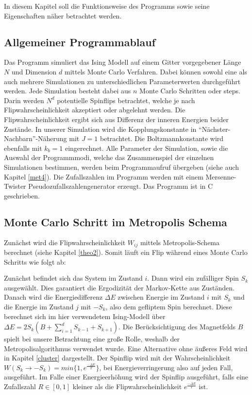 
In diesem Kapitel soll die Funktionsweise des Programms sowie seine Eigenschaften näher betrachtet werden.


\subsection{Allgemeiner Programmablauf}

Das Programm simuliert das Ising Modell auf einem Gitter vorgegebener Länge $N$ und Dimension $d$ mittels Monte Carlo Verfahren. Dabei können sowohl eine als auch mehrere Simulationen zu unterschiedlichen Parameterwerten durchgeführt werden. Jede Simulation besteht dabei aus $n$ Monte Carlo Schritten oder steps. Darin werden $N^{d}$ potentielle Spinflips betrachtet, welche je nach Flipwahrscheinlichkeit akzeptiert oder abgelehnt werden. Die Flipwahrscheinlichkeit ergibt sich aus Differenz der inneren Energien beider Zustände. In unserer Simulation wird die Kopplungskonstante in “Nächster-Nachbarn”-Näherung mit $J=1$ betrachtet. Die Boltzmannkonstante wird ebenfalls mit $k_{b}=1$ eingerechnet. 
Alle Parameter der Simulation, sowie die Auswahl der Programmmodi, welche das Zusammenspiel der einzelnen Simulationen bestimmen, werden beim Programmaufruf übergeben (siehe auch Kapitel \ref{met4}). Die Zufallszahlen im Programm werden mit einem Mersenne-Twister Pseudozufallszahlengenerator erzeugt. Das Programm ist in C geschrieben.


\subsection{Monte Carlo Schritt im Metropolis Schema}

Zunächst wird die Flipwahrscheinlichkeit $W_{ij}$ mittels Metropolis-Schema berechnet (siehe Kapitel \ref{theo2}).
Somit läuft ein Flip während eines Monte Carlo Schritts wie folgt ab:


Zunächst befindet sich das System im Zustand $i$. Dann wird ein zufälliger Spin $S_{k}$ ausgewählt. Dies garantiert die Ergodizität der Markov-Kette aus Zuständen. Danach wird die Energiedifferenz $\Delta E$ zwischen Energie im Zustand $i$ mit $S_{k}$ und die Energie im Zustand $j$ mit $-S_{k}$, also dem gefliptem Spin berechnet. Diese berechnet sich im hier verwendetem Ising-Modell über $\Delta E=2S_{k}(B+\sum_{i=1}^{d}S_{k-1}+S_{k+1})$. Die Berücksichtigung des Magnetfelds $B$ spielt bei unsere Betrachtung eine große Rolle, weshalb der Metropolisalgorithmus verwendet wurde. Eine Alternative ohne äußeres Feld wird in Kapitel \ref{cluster} dargestellt. Der Spinflip wird mit der Wahrscheinlichkeit $W(S_k \rightarrow -S_k)=min\{ 1, e^{\frac{-\Delta E}{T}} \}$, bei Energieverringerung also auf jeden Fall, ausgeführt. Im Falle einer Energieerhöhung wird der Spinflip ausgeführt, falls eine Zufallszahl $R\in[0,1]$ kleiner als die Flipwahrscheinlichkeit $e^{\frac{-\Delta E}{T}}$ ist.


